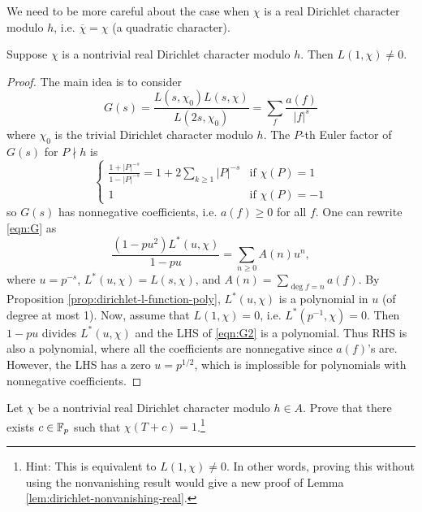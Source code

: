 We need to be more careful about the case when $\chi$ is a real Dirichlet character modulo $h$, i.e. $\overline{\chi} = \chi$ (a quadratic character).
\begin{lemma}
    \label{lem:dirichlet-nonvanishing-real}
    Suppose $\chi$ is a nontrivial real Dirichlet character modulo $h$.
    Then $L(1, \chi) \ne 0$.
\end{lemma}
\begin{proof}
    The main idea is to consider
    \begin{equation}
    \label{eqn:G}
    G(s) = \frac{L(s, \chi_0) L(s, \chi)}{L(2s, \chi_0)} = \sum_{f} \frac{a(f)}{|f|^{s}}
    \end{equation}
    where $\chi_0$ is the trivial Dirichlet character modulo $h$.
    The $P$-th Euler factor of $G(s)$ for $P \nmid h$ is
    \[
    \begin{cases}
        \frac{1 + |P|^{-s}}{1 - |P|^{-s}} = 1 + 2 \sum_{k \ge 1} |P|^{-s} & \text{if }\chi(P) = 1 \\
        1 & \text{if }\chi(P) = -1
    \end{cases}
    \]
    so $G(s)$ has nonnegative coefficients, i.e. $a(f) \ge 0$ for all $f$.
    One can rewrite \eqref{eqn:G} as
    \begin{equation}
        \frac{(1 - pu^2) L^\ast(u, \chi)}{1 - pu} = \sum_{n \ge 0} A(n) u^n,
        \label{eqn:G2}
    \end{equation}
    where $u = p^{-s}$, $L^\ast(u, \chi) = L(s, \chi)$, and $A(n) = \sum_{\deg f = n} a(f)$.
    By Proposition \ref{prop:dirichlet-l-function-poly}, $L^\ast(u, \chi)$ is a polynomial in $u$ (of degree at most 1).
    Now, assume that $L(1, \chi) = 0$, i.e. $L^\ast(p^{-1}, \chi) = 0$.
    Then $1 - pu$ divides $L^\ast(u, \chi)$ and the LHS of \eqref{eqn:G2} is a polynomial.
    Thus RHS is also a polynomial, where all the coefficients are nonnegative since $a(f)$'s are.
    However, the LHS has a zero $u = p^{1/2}$, which is implossible for polynomials with nonnegative coefficients.
\end{proof}

\begin{exercise}
    Let $\chi$ be a nontrivial real Dirichlet character modulo $h \in A$.
    Prove that there exists $c \in \mathbb{F}_p$ such that $\chi(T + c) = 1$.\footnote{Hint: This is equivalent to $L(1, \chi) \ne 0$. In other words, proving this without using the nonvanishing result would give a new proof of Lemma \ref{lem:dirichlet-nonvanishing-real}.}
\end{exercise}

